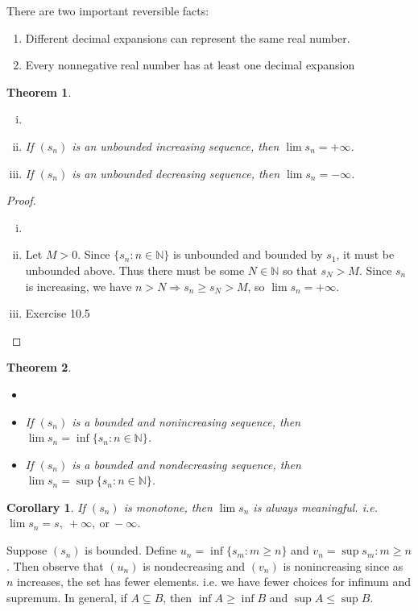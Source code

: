 \documentclass[12pt, lettersize]{book}
\theoremstyle{plain}
\newtheorem{thm}{Theorem}[section]
\newtheorem{cor}{Corollary}[thm]
\theoremstyle{definition}
\theoremstyle{remark}
\newcommand{\N}{\mathbb{N}}
\begin{document}
		There are two important reversible facts:
		\begin{enumerate}
			\item Different decimal expansions can represent the same real number.
			\item Every nonnegative real number has at least one decimal expansion
		\end{enumerate}\bigskip

		\begin{thm}\label{def:unbounded monotone seq}
		\begin{enumerate}[(i)]
			\item[]
			\item If $(s_n)$ is an unbounded increasing sequence, then $\lim s_n=+\infty$.
			\item If $(s_n)$ is an unbounded decreasing sequence, then $\lim s_n=-\infty$.
		\end{enumerate}
		\end{thm}
		\begin{proof}
		\begin{enumerate}[(i)]
			\item[]
			\item Let $M>0$. Since $\{s_n: n\in\mathbb{N}\}$ is unbounded and bounded by $s_1$, it must be unbounded above.
			Thus there must be some $N\in\mathbb{N}$ so that $s_N>M$. Since $s_n$ is increasing, we have $n>N\Rightarrow s_n\geq s_N>M$, so $\lim s_n=+\infty$. 
			\item Exercise 10.5
		\end{enumerate}
		\end{proof}
		\begin{thm}
		\begin{itemize}
			\item[]
			\item If $(s_n)$ is a bounded and nonincreasing sequence, then $\lim s_n=\inf\{s_n: n\in\N\}$.
			\item If $(s_n)$ is a bounded and nondecreasing sequence, then $\lim s_n=\sup\{s_n: n\in\N\}$.
		\end{itemize}
		\end{thm}
		\begin{cor}
		If $(s_n)$ is monotone, then $\lim s_n$ is always meaningful. i.e. $\lim s_n=s,\ +\infty,\ \text{or}\ -\infty$.
		\end{cor}\bigskip
	
		Suppose $(s_n)$ is bounded. Define $u_n=\inf\{s_m: m\geq n\}$ and $v_n=\sup{s_m: m\geq n}$. Then observe that $(u_n)$ is nondecreasing and $(v_n)$ is nonincreasing since as $n$ increases, the set has fewer elements. i.e. we have fewer choices for infimum and supremum. In general, if $A\subseteq B$, then $\inf A\geq \inf B$ and $\sup A\leq \sup B$.
		
\end{document}
